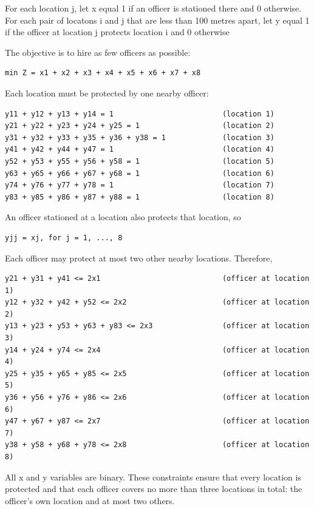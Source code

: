 \documentclass[12pt,fleqn]{article}
\begin{document}
For each location j, let x equal 1 if an officer is stationed there and 0
otherwise. For each pair of locatons i and j that are less than 100 metres
apart, let y equal 1 if the officer at location j protects location i and 0
otherwise

The objective is to hire as few officers as possible:
\begin{verbatim}
min Z = x1 + x2 + x3 + x4 + x5 + x6 + x7 + x8
\end{verbatim}

Each location must be protected by one nearby officer:
\begin{verbatim}
y11 + y12 + y13 + y14 = 1                         (location 1)
y21 + y22 + y23 + y24 + y25 = 1                   (location 2)
y31 + y32 + y33 + y35 + y36 + y38 = 1             (location 3)
y41 + y42 + y44 + y47 = 1                         (location 4)
y52 + y53 + y55 + y56 + y58 = 1                   (location 5)
y63 + y65 + y66 + y67 + y68 = 1                   (location 6)
y74 + y76 + y77 + y78 = 1                         (location 7)
y83 + y85 + y86 + y87 + y88 = 1                   (location 8)
\end{verbatim}

An officer stationed at a location also protects that location, so
\begin{verbatim}
yjj = xj, for j = 1, ..., 8
\end{verbatim}

Each officer may protect at most two other nearby locations. Therefore,
\begin{verbatim}
y21 + y31 + y41 <= 2x1                            (officer at location 1)
y12 + y32 + y42 + y52 <= 2x2                      (officer at location 2)
y13 + y23 + y53 + y63 + y83 <= 2x3                (officer at location 3)
y14 + y24 + y74 <= 2x4                            (officer at location 4)
y25 + y35 + y65 + y85 <= 2x5                      (officer at location 5)
y36 + y56 + y76 + y86 <= 2x6                      (officer at location 6)
y47 + y67 + y87 <= 2x7                            (officer at location 7)
y38 + y58 + y68 + y78 <= 2x8                      (officer at location 8)
\end{verbatim}

All x and y variables are binary. These constraints ensure that every location
is protected and that each officer covers no more than three locations in
total: the officer's own location and at most two others.
\end{document}
